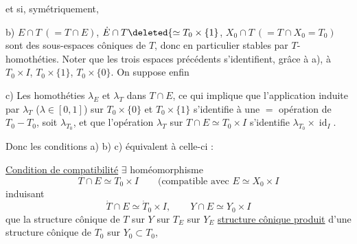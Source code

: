 
et si, symétriquement,

b) $E\cap T\ (=T\cap E)$, $\dot E\cap T\deleted{\simeq T_0\times\{1}$,
$X_0\cap T\ (=T\cap X_0=T_0)$ sont des
sous-espaces côniques de $T$, donc en particulier
stables par $T$-homothéties.  Noter que
les trois espaces précédents s'identifient, grâce à a),
à $T_0\times I$, $T_0\times\{1\}$, $T_0\times\{0\}$. On suppose enfin

c) Les homothéties  $\lambda_E$ et $\lambda_T$ 
dans $T\cap E$, ce qui implique que l'application
 induite par $\lambda_T$ ($\lambda\in[0,1]$) sur
$T_0\times\{0\}$ et $T_0\times\{1\}$
s'identifie à une $=$  opération de
$T_0-T_0$,  soit $\lambda_{T_0}$, et que l'opération
$\lambda_T$ sur $T\cap E\simeq T_0\times I$ s'identifie 
 $\lambda_{T_0}\times\operatorname{id}_I$.

Donc les conditions a) b) c) équivalent à celle-ci :

\uline{Condition de compatibilité} $\exists$ homéomorphisme
\[
T\cap E\simeq T_0\times I
\qquad\text{(compatible avec }E\simeq X_0\times I
\]
induisant
\[
\dot T\cap E\simeq\dot T_0\times I,\qquad Y\cap E\simeq Y_0\times I
\]
 que la structure cônique de $T$ sur $Y$
 sur $T_E$ sur $Y_E$
 
\uline{structure cônique produit} 
d'une structure cônique de
$T_0$ sur $Y_0\subset T_0$, 
